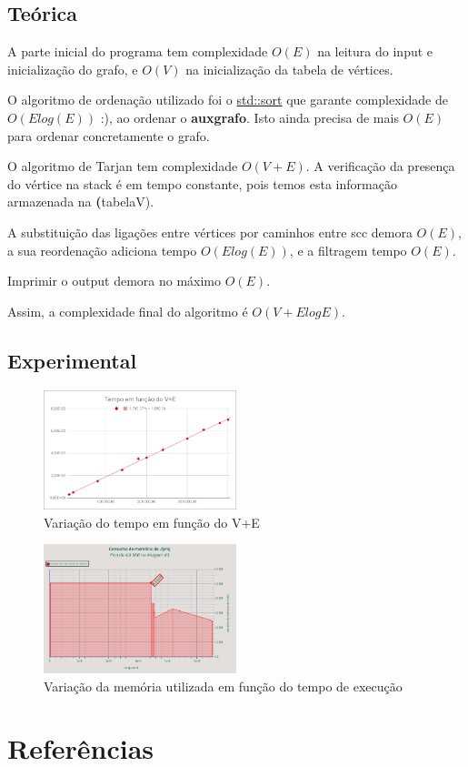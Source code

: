 \documentclass[12pt,a4paper]{article}
\begin{document}
\subsection{Teórica}
A parte inicial do programa tem complexidade $O(E)$ na leitura do input e inicialização do grafo, e $O(V)$ na inicialização da tabela de vértices.

O algoritmo de ordenação utilizado foi o \href{http://www.cplusplus.com/reference/algorithm/sort/}{std::sort} que garante complexidade de $O(Elog(E))$ :), ao ordenar o \textbf{auxgrafo}.
Isto ainda precisa de mais $O(E)$ para ordenar concretamente o grafo.

O algoritmo de Tarjan tem complexidade $O(V+E)$. A verificação da presença do vértice na stack é em tempo constante, pois temos esta informação armazenada na \textbf(tabelaV).

A substituição das ligações entre vértices por caminhos entre scc demora $O(E)$, a sua reordenação adiciona tempo $O(Elog(E))$, e a filtragem tempo $O(E)$.

Imprimir o output demora no máximo $O(E)$.

Assim, a complexidade final do algoritmo é \textbf{$O(V+ElogE)$}.

\subsection{Experimental}

\begin{figure}[h]
			\centering
			\includegraphics[width=0.5\textwidth]{ss_t(V+E)}
			\caption{Variação do tempo em função do V+E}
\end{figure}
\begin{figure}[h]
			\centering
			\includegraphics[width=0.5\textwidth]{ss_m(tex)}
			\caption{Variação da memória utilizada em função do tempo de execução}
\end{figure}

\section{Referências}
\end{document}
